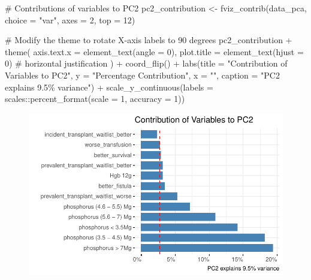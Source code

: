 \documentclass[
  letterpaper,
  DIV=11,
  numbers=noendperiod]{scrreprt}
\newenvironment{Shaded}{\begin{snugshade}}{\end{snugshade}}
\newcommand{\AttributeTok}[1]{\textcolor[rgb]{0.40,0.45,0.13}{#1}}
\newcommand{\CommentTok}[1]{\textcolor[rgb]{0.37,0.37,0.37}{#1}}
\newcommand{\DecValTok}[1]{\textcolor[rgb]{0.68,0.00,0.00}{#1}}
\newcommand{\FunctionTok}[1]{\textcolor[rgb]{0.28,0.35,0.67}{#1}}
\newcommand{\NormalTok}[1]{\textcolor[rgb]{0.00,0.23,0.31}{#1}}
\newcommand{\OtherTok}[1]{\textcolor[rgb]{0.00,0.23,0.31}{#1}}
\newcommand{\SpecialCharTok}[1]{\textcolor[rgb]{0.37,0.37,0.37}{#1}}
\newcommand{\StringTok}[1]{\textcolor[rgb]{0.13,0.47,0.30}{#1}}
\begin{document}
\begin{Shaded}
\begin{Highlighting}[]
\CommentTok{\# Contributions of variables to PC2}
\NormalTok{pc2\_contribution }\OtherTok{\textless{}{-}} \FunctionTok{fviz\_contrib}\NormalTok{(data\_pca, }\AttributeTok{choice =} \StringTok{"var"}\NormalTok{, }\AttributeTok{axes =} \DecValTok{2}\NormalTok{, }\AttributeTok{top =} \DecValTok{12}\NormalTok{)}

\CommentTok{\# Modify the theme to rotate X{-}axis labels to 90 degrees}
\NormalTok{pc2\_contribution }\SpecialCharTok{+}
  \FunctionTok{theme}\NormalTok{(}
    \AttributeTok{axis.text.x =} \FunctionTok{element\_text}\NormalTok{(}\AttributeTok{angle =} \DecValTok{0}\NormalTok{),}
    \AttributeTok{plot.title =} \FunctionTok{element\_text}\NormalTok{(}\AttributeTok{hjust =} \DecValTok{0}\NormalTok{)  }\CommentTok{\# horizontal justification}
\NormalTok{  ) }\SpecialCharTok{+}
  \FunctionTok{coord\_flip}\NormalTok{() }\SpecialCharTok{+}
  \FunctionTok{labs}\NormalTok{(}\AttributeTok{title =} \StringTok{"Contribution of Variables to PC2"}\NormalTok{,}
       \AttributeTok{y =} \StringTok{"Percentage Contribution"}\NormalTok{,}
       \AttributeTok{x =} \StringTok{""}\NormalTok{,}
       \AttributeTok{caption =} \StringTok{"PC2 explains 9.5\% variance"}\NormalTok{) }\SpecialCharTok{+}
  \FunctionTok{scale\_y\_continuous}\NormalTok{(}\AttributeTok{labels =}\NormalTok{ scales}\SpecialCharTok{::}\FunctionTok{percent\_format}\NormalTok{(}\AttributeTok{scale =} \DecValTok{1}\NormalTok{,}
                                                     \AttributeTok{accuracy =} \DecValTok{1}\NormalTok{))}
\end{Highlighting}
\end{Shaded}

\begin{figure}[H]

{\centering \includegraphics{analysis_files/figure-pdf/unnamed-chunk-24-2.pdf}

}

\end{figure}
\end{document}
